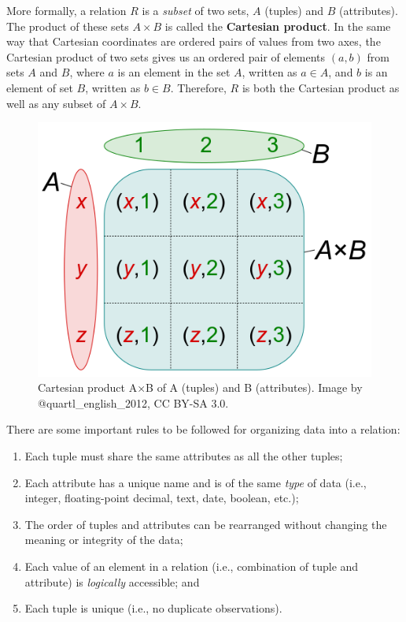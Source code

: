 \documentclass[
]{book}
\providecommand{\tightlist}{%
  \setlength{\itemsep}{0pt}\setlength{\parskip}{0pt}}
\begin{document}
More formally, a relation \(R\) is a \emph{subset} of two sets, \(A\) (tuples) and \(B\) (attributes). The product of these sets \(A×B\) is called the \textbf{Cartesian product}. In the same way that Cartesian coordinates are ordered pairs of values from two axes, the Cartesian product of two sets gives us an ordered pair of elements \((a,b)\) from sets \(A\) and \(B\), where \(a\) is an element in the set \(A\), written as \(a∈A\), and \(b\) is an element of set \(B\), written as \(b∈B\). Therefore, \(R\) is both the Cartesian product as well as any subset of \(A×B\).

\begin{figure}
\includegraphics[width=0.75\linewidth]{images/05-cartesian-product} \caption{Cartesian product A×B of A (tuples) and B (attributes). Image by @quartl_english_2012, CC BY-SA 3.0.}\label{fig:5-cartesian-product}
\end{figure}

There are some important rules to be followed for organizing data into a relation:

\begin{enumerate}
\def\labelenumi{\arabic{enumi}.}
\tightlist
\item
  Each tuple must share the same attributes as all the other tuples;
\item
  Each attribute has a unique name and is of the same \emph{type} of data (i.e., integer, floating-point decimal, text, date, boolean, etc.);
\item
  The order of tuples and attributes can be rearranged without changing the meaning or integrity of the data;
\item
  Each value of an element in a relation (i.e., combination of tuple and attribute) is \emph{logically} accessible; and
\item
  Each tuple is unique (i.e., no duplicate observations).
\end{enumerate}
\end{document}
